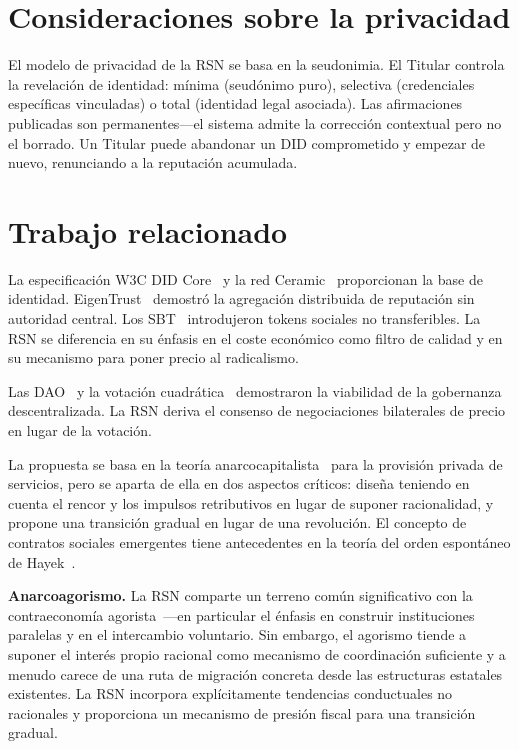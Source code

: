 \documentclass[11pt,a4paper,twocolumn]{article}
\begin{document}
\section{Consideraciones sobre la privacidad}

El modelo de privacidad de la RSN se basa en la seudonimia. El Titular controla la revelación de identidad: mínima (seudónimo puro), selectiva (credenciales específicas vinculadas) o total (identidad legal asociada). Las afirmaciones publicadas son permanentes---el sistema admite la corrección contextual pero no el borrado. Un Titular puede abandonar un DID comprometido y empezar de nuevo, renunciando a la reputación acumulada.

\section{Trabajo relacionado}

La especificación W3C DID Core~\cite{did2022} y la red Ceramic~\cite{ceramic2023} proporcionan la base de identidad. EigenTrust~\cite{kamvar2003} demostró la agregación distribuida de reputación sin autoridad central. Los SBT~\cite{weyl2022} introdujeron tokens sociales no transferibles. La RSN se diferencia en su énfasis en el coste económico como filtro de calidad y en su mecanismo para poner precio al radicalismo.

Las DAO~\cite{buterin2014} y la votación cuadrática~\cite{buterin2019} demostraron la viabilidad de la gobernanza descentralizada. La RSN deriva el consenso de negociaciones bilaterales de precio en lugar de la votación.

La propuesta se basa en la teoría anarcocapitalista~\cite{rothbard1973,hoppe2001} para la provisión privada de servicios, pero se aparta de ella en dos aspectos críticos: diseña teniendo en cuenta el rencor y los impulsos retributivos en lugar de suponer racionalidad, y propone una transición gradual en lugar de una revolución. El concepto de contratos sociales emergentes tiene antecedentes en la teoría del orden espontáneo de Hayek~\cite{hayek1973}.

\textbf{Anarcoagorismo.} La RSN comparte un terreno común significativo con la contraeconomía agorista~\cite{konkin2006}---en particular el énfasis en construir instituciones paralelas y en el intercambio voluntario. Sin embargo, el agorismo tiende a suponer el interés propio racional como mecanismo de coordinación suficiente y a menudo carece de una ruta de migración concreta desde las estructuras estatales existentes. La RSN incorpora explícitamente tendencias conductuales no racionales y proporciona un mecanismo de presión fiscal para una transición gradual.
\end{document}
